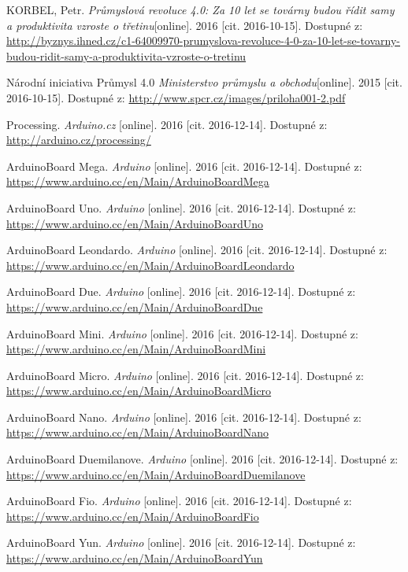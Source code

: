 \begin{literatura}{99}
 KORBEL, Petr. \textit{Průmyslová revoluce 4.0: Za 10 let se továrny budou řídit samy a produktivita vzroste o třetinu}[online]. 2016 [cit. 2016-10-15]. Dostupné z: \url{http://byznys.ihned.cz/c1-64009970-prumyslova-revoluce-4-0-za-10-let-se-tovarny-budou-ridit-samy-a-produktivita-vzroste-o-tretinu}

 Národní iniciativa Průmysl 4.0 \textit{Ministerstvo průmyslu a obchodu}[online]. 2015 [cit. 2016-10-15]. Dostupné z: \url{http://www.spcr.cz/images/priloha001-2.pdf}

 Processing. \textit{Arduino.cz} [online]. 2016 [cit. 2016-12-14]. Dostupné z: \url{http://arduino.cz/processing/}

 ArduinoBoard Mega. \textit{Arduino} [online]. 2016 [cit. 2016-12-14]. Dostupné z: \url{https://www.arduino.cc/en/Main/ArduinoBoardMega}

 ArduinoBoard Uno. \textit{Arduino} [online]. 2016 [cit. 2016-12-14]. Dostupné z: \url{https://www.arduino.cc/en/Main/ArduinoBoardUno}

 ArduinoBoard Leondardo. \textit{Arduino} [online]. 2016 [cit. 2016-12-14].  Dostupné z: \url{https://www.arduino.cc/en/Main/ArduinoBoardLeondardo}

 ArduinoBoard Due. \textit{Arduino} [online]. 2016 [cit. 2016-12-14]. Dostupné z: \url{https://www.arduino.cc/en/Main/ArduinoBoardDue}

 ArduinoBoard Mini. \textit{Arduino} [online]. 2016 [cit. 2016-12-14]. Dostupné z: \url{https://www.arduino.cc/en/Main/ArduinoBoardMini}

 ArduinoBoard Micro. \textit{Arduino} [online]. 2016 [cit. 2016-12-14]. Dostupné z: \url{https://www.arduino.cc/en/Main/ArduinoBoardMicro}

 ArduinoBoard Nano. \textit{Arduino} [online]. 2016 [cit. 2016-12-14]. Dostupné z: \url{https://www.arduino.cc/en/Main/ArduinoBoardNano}

 ArduinoBoard Duemilanove. \textit{Arduino} [online]. 2016 [cit. 2016-12-14]. Dostupné z: \url{https://www.arduino.cc/en/Main/ArduinoBoardDuemilanove}

 ArduinoBoard Fio. \textit{Arduino} [online]. 2016 [cit. 2016-12-14]. Dostupné z: \url{https://www.arduino.cc/en/Main/ArduinoBoardFio}

 ArduinoBoard Yun. \textit{Arduino} [online]. 2016 [cit. 2016-12-14]. Dostupné z: \url{https://www.arduino.cc/en/Main/ArduinoBoardYun}


\end{literatura}
